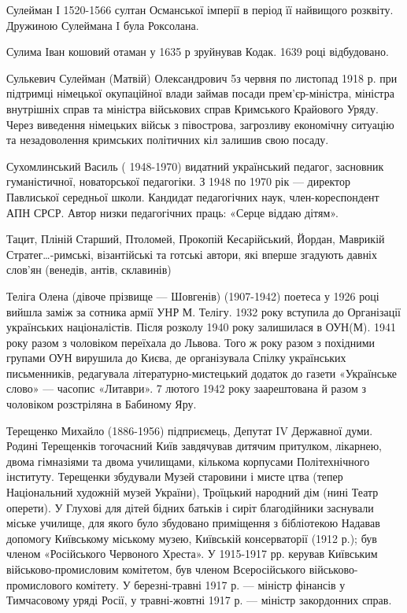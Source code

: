 Сулейман І 1520-1566 султан Османської імперії в період її найвищого розквіту. Дружиною Сулеймана I була Роксолана.

Сулима Іван  кошовий отаман у 1635 р зруйнував Кодак. 1639 році відбудовано.

Сулькевич Сулейман (Матвій) Олександрович  5з червня по  листопад 1918 р. при підтримці німецької окупаційної влади займав посади прем'єр-міністра, міністра внутрішніх справ та міністра військових справ Кримського Крайового Уряду. Через виведення німецьких військ з півострова, загрозливу економічну ситуацію та незадоволення кримських політичних кіл залишив свою посаду. 

Сухомлинський Василь  ( 1948-1970) видатний український педагог, засновник гуманістичної, новаторської педагогіки. З 1948 по 1970 рік --- директор Павлиської середньої школи. Кандидат педагогічних наук, член-кореспондент АПН СРСР. Автор низки педагогічних праць: «Серце віддаю дітям». 

Тацит, Пліній Старший, Птоломей, Прокопій Кесарійський, Йордан, Маврикій Стратег…-римські, візантійські та готські автори, які вперше згадують давніх слов’ян (венедів, антів, склавинів)

Теліга Олена (дівоче прізвище --- Шовгенів) (1907-1942) поетеса у 1926 році вийшла заміж за сотника армії УНР М. Телігу. 1932 року вступила до Організації українських націоналістів. Після розколу 1940 року залишилася в ОУН(М). 1941 року разом з чоловіком переїхала до Львова. Того ж року разом з похідними групами ОУН вирушила до Києва, де організувала Спілку українських письменників, редагувала літературно-мистецький додаток до газети «Українське слово» --- часопис «Литаври». 7 лютого 1942 року заарештована й разом з чоловіком розстріляна в Бабиному Яру.

Терещенко Михайло (1886-1956)  підприємець,  Депутат IV Державної думи. Родині Терещенків тогочасний Київ завдячував дитячим притулком, лікарнею, двома гімназіями та двома училищами, кількома корпусами Політехнічного інституту. Терещенки збудували Музей старовини і мисте цтва (тепер Національний художній музей України), Троїцький народний дім (нині Театр оперети). У Глухові для дітей бідних батьків і сиріт благодійники заснували міське училище, для якого було збудовано приміщення з бібліотекою Надавав допомогу Київському міському музею, Київській консерваторії (1912 р.); був членом «Російського Червоного Хреста». У 1915-1917 рр. керував Київським військово-промисловим комітетом, був членом Всеросійського військово-промислового комітету. У березні-травні 1917 р. --- міністр фінансів у Тимчасовому уряді Росії, у травні-жовтні 1917 р. --- міністр закордонних справ.

